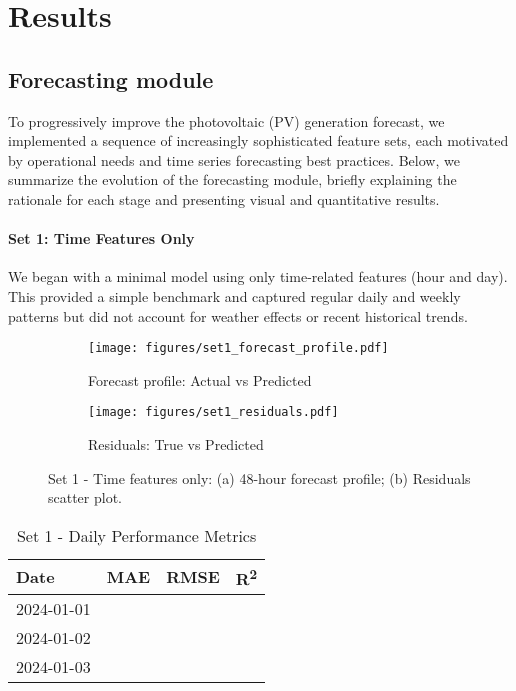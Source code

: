 \newpage
\section{Results}

\subsection{Forecasting module}

To progressively improve the photovoltaic (PV) generation forecast, we implemented a 
sequence of increasingly sophisticated feature sets, each motivated by operational needs 
and time series forecasting best practices. Below, we summarize the evolution of the 
forecasting module, briefly explaining the rationale for each stage and presenting visual 
and quantitative results.

\paragraph{Set 1: Time Features Only}
We began with a minimal model using only time-related features (hour and day). This 
provided a simple benchmark and captured regular daily and weekly patterns but did not 
account for weather effects or recent historical trends.

\begin{figure}[H]
    \centering
    \begin{subfigure}{0.49\textwidth}
        \texttt{[image: figures/set1\_forecast\_profile.pdf]}
        \caption{Forecast profile: Actual vs Predicted}
    \end{subfigure}
    \begin{subfigure}{0.49\textwidth}
        \texttt{[image: figures/set1\_residuals.pdf]}
        \caption{Residuals: True vs Predicted}
    \end{subfigure}
    \caption{Set 1 - Time features only: (a) 48-hour forecast profile; (b) Residuals scatter plot.}
\end{figure}

\begin{table}[H]
    \centering
    \caption{Set 1 - Daily Performance Metrics}
    \begin{tabular}{lccc}
        \toprule
        Date        & MAE    & RMSE   & R\textsuperscript{2} \\
        \midrule
        2024-01-01  &        &        &       \\
        2024-01-02  &        &        &       \\
        2024-01-03  &        &        &       \\
        \bottomrule
    \end{tabular}
\end{table}

